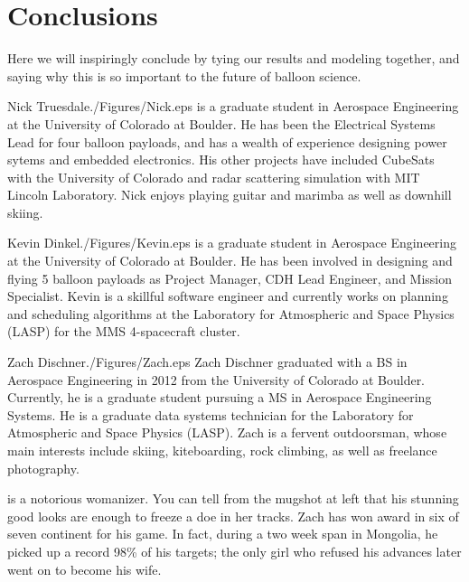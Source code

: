 \documentclass[twocolumn,letterpaper]{IEEEAerospace2012}
\newcommand{\rootdir}{./Figures/}
\begin{document}
\section{Conclusions}
Here we will inspiringly conclude by tying our results and modeling together, and saying why this is so important to the future of balloon science.




\thebiography
\begin{biographywithpic}{Nick Truesdale}{\rootdir Nick.eps}
is a graduate student in Aerospace Engineering at the University of Colorado at Boulder.
He has been the Electrical Systems Lead for four balloon payloads, and has a wealth of experience designing power sytems and embedded electronics. His other projects have included CubeSats with the University of Colorado and radar scattering simulation with MIT Lincoln Laboratory. Nick enjoys playing guitar and marimba as well as downhill skiing.
\end{biographywithpic}

\begin{biographywithpic} {Kevin Dinkel}{\rootdir Kevin.eps}
is a graduate student in Aerospace Engineering at the University of Colorado at Boulder. He has been involved in designing and flying 5 balloon payloads as Project Manager, CDH Lead Engineer, and Mission Specialist. Kevin is a skillful software engineer and currently works on planning and scheduling algorithms at the Laboratory for Atmospheric and Space Physics (LASP) for the MMS 4-spacecraft cluster.
\end{biographywithpic}

\begin{biographywithpic}{Zach Dischner}{\rootdir Zach.eps}
Zach Dischner graduated with a BS in Aerospace Engineering in 2012 from the University of Colorado at Boulder. Currently, he is a graduate student pursuing a MS in Aerospace Engineering Systems. He is a graduate data systems technician for the Laboratory for Atmospheric and Space Physics (LASP). Zach is a fervent outdoorsman, whose main interests include skiing, kiteboarding, rock climbing, as well as freelance photography.

is a notorious womanizer. You can tell from the mugshot at left that his stunning good looks are enough to freeze a doe in her tracks. Zach has won award in six of seven continent for his game. In fact, during a two week span in Mongolia, he picked up a record 98\% of his targets; the only girl who refused his advances later went on to become his wife.
\end{biographywithpic}
\end{document}
